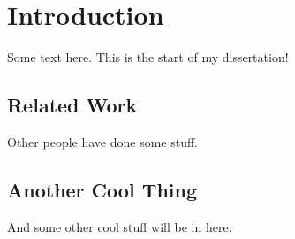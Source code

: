 \chapter{Introduction}
Some text here. This is the start of my dissertation!

\section{Related Work}
Other people have done some stuff.

\section{Another Cool Thing}
And some other cool stuff will be in here.